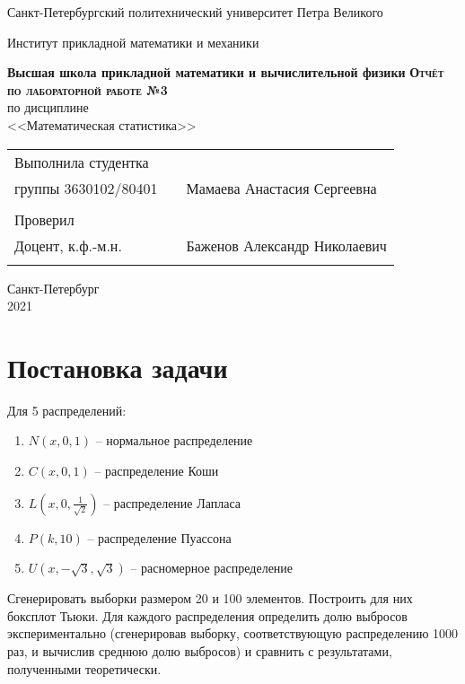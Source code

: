\documentclass[a4paper]{article}
\begin{document}
\begin{titlepage}
  \begin{center}
    \large
    Санкт-Петербургский политехнический университет Петра Великого
    
    Институт прикладной математики и механики
    
    \textbf{Высшая школа прикладной математики и вычислительной физики}
    \vfill
    \textsc{\textbf{\large{Отчёт по лабораторной работе №3}}}\\[5mm]
     по дисциплине\\ <<Математическая статистика>>\\
\end{center}

\vfill

\begin{tabular}{l p{} l}
Выполнила студентка \\группы 3630102/80401 && Мамаева Анастасия Сергеевна \\
\\
Проверил\\Доцент, к.ф.-м.н.& \hspace{0pt} &   Баженов Александр Николаевич \\\\
\end{tabular}

\hfill \break
\hfill \break
\begin{center} Санкт-Петербург \\2021 \end{center}
\thispagestyle{empty}
\end{titlepage}
\newpage
\newpage
\begin{center}
    \setcounter{page}{2}
    \tableofcontents
\end{center}
\newpage
\begin{center}
    \setcounter{page}{3}
    \listoffigures
\end{center}

\newpage
\section {Постановка задачи}
\noindent Для 5 распределений:
\begin{enumerate}
	\item $N(x, 0, 1)$ -- нормальное распределение
	\item $C(x, 0, 1)$ -- распределение Коши
	\item $L(x, 0, \frac{1}{\sqrt{2}})$ -- распределение Лапласа 
	\item $P(k, 10)$ -- распределение Пуассона
	\item $U(x, -\sqrt{3}, \sqrt{3})$ -- расномерное распределение
\end{enumerate}
Сгенерировать выборки размером 20 и 100 элементов.
Построить для них боксплот Тьюки.
Для каждого распределения определить долю выбросов экспериментально (сгенерировав выборку, соответствующую распределению 1000 раз, и вычислив среднюю долю выбросов) и сравнить с результатами, полученными теоретически.
\end{document}
